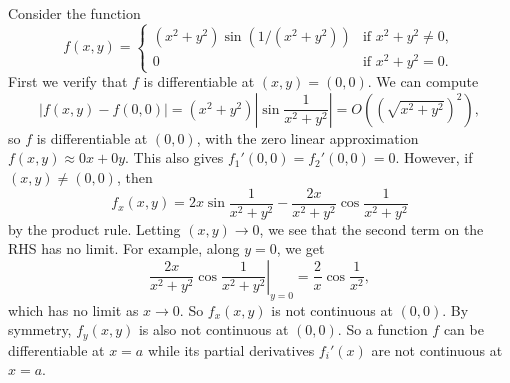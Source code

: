 \begin{example}
  Consider the function
  \[
    f(x, y) =
    \begin{cases}
      (x^2 + y^2) \sin(1 / (x^2 + y^2)) & \text{if } x^2 + y^2 \ne 0, \\
      0 & \text{if } x^2 + y^2 = 0.
    \end{cases}
  \]
  First we verify that $f$ is differentiable at
  $(x, y) = (0, 0)$. We can compute
  \[
    |f(x, y) - f(0, 0)| = (x^2 + y^2) \left|\sin \frac{1}{x^2 + y^2}\right|
    = O((\sqrt{x^2 + y^2})^2),
  \]
  so $f$ is differentiable at $(0, 0)$, with the
  zero linear approximation $f(x, y) \approx 0x + 0y$.
  This also gives $f_1'(0, 0) = f_2'(0, 0) = 0$. However,
  if $(x, y) \ne (0, 0)$, then
  \[
    f_x(x, y) =
    2x \sin \frac{1}{x^2 + y^2} - \frac{2x}{x^2 + y^2} \cos \frac{1}{x^2 + y^2}
  \]
  by the product rule. Letting $(x, y) \to 0$, we see that
  the second term on the RHS has no limit. For
  example, along $y = 0$, we get
  \[
    \left.\frac{2x}{x^2 + y^2} \cos \frac{1}{x^2 + y^2} \right|_{y = 0}
      = \frac{2}{x} \cos \frac{1}{x^2},
  \]
  which has no limit as $x \to 0$. So $f_x(x, y)$ is
  not continuous at $(0, 0)$. By symmetry,
  $f_y(x, y)$ is also
  not continuous at $(0, 0)$. So a function $f$ can
  be differentiable at $x = a$ while its partial
  derivatives $f_i'(x)$ are
  not continuous at $x = a$.
\end{example}
